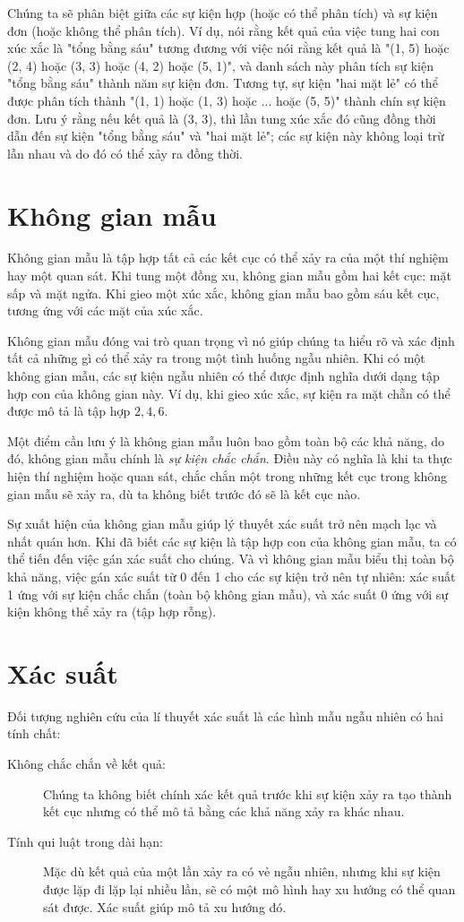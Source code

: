 \documentclass[12pt]{article} %
\begin{document}
Chúng ta sẽ phân biệt giữa các sự kiện hợp (hoặc có thể phân tích) và sự kiện đơn (hoặc không thể phân tích). Ví dụ, nói rằng kết quả của việc tung hai con xúc xắc là "tổng bằng sáu" tương đương với việc nói rằng kết quả là "(1, 5) hoặc (2, 4) hoặc (3, 3) hoặc (4, 2) hoặc (5, 1)", và danh sách này phân tích sự kiện "tổng bằng sáu" thành năm sự kiện đơn. Tương tự, sự kiện "hai mặt lẻ" có thể được phân tích thành "(1, 1) hoặc (1, 3) hoặc ... hoặc (5, 5)" thành chín sự kiện đơn. Lưu ý rằng nếu kết quả là (3, 3), thì lần tung xúc xắc đó cũng đồng thời dẫn đến sự kiện "tổng bằng sáu" và "hai mặt lẻ"; các sự kiện này không loại trừ lẫn nhau và do đó có thể xảy ra đồng thời.

\section{Không gian mẫu}

Không gian mẫu là tập hợp tất cả các kết cục có thể xảy ra của một thí nghiệm hay một quan sát. Khi tung một đồng xu, không gian mẫu gồm hai kết cục: mặt sấp và mặt ngửa. Khi gieo một xúc xắc, không gian mẫu bao gồm sáu kết cục, tương ứng với các mặt của xúc xắc.

Không gian mẫu đóng vai trò quan trọng vì nó giúp chúng ta hiểu rõ và xác định tất cả những gì có thể xảy ra trong một tình huống ngẫu nhiên. Khi có một không gian mẫu, các sự kiện ngẫu nhiên có thể được định nghĩa dưới dạng tập hợp con của không gian này. Ví dụ, khi gieo xúc xắc, sự kiện ra mặt chẵn có thể được mô tả là tập hợp ${2, 4, 6}$.

Một điểm cần lưu ý là không gian mẫu luôn bao gồm toàn bộ các khả năng, do đó, không gian mẫu chính là \emph{sự kiện chắc chắn}. Điều này có nghĩa là khi ta thực hiện thí nghiệm hoặc quan sát, chắc chắn một trong những kết cục trong không gian mẫu sẽ xảy ra, dù ta không biết trước đó sẽ là kết cục nào.

Sự xuất hiện của không gian mẫu giúp lý thuyết xác suất trở nên mạch lạc và nhất quán hơn. Khi đã biết các sự kiện là tập hợp con của không gian mẫu, ta có thể tiến đến việc gán xác suất cho chúng. Và vì không gian mẫu biểu thị toàn bộ khả năng, việc gán xác suất từ 0 đến 1 cho các sự kiện trở nên tự nhiên: xác suất 1 ứng với sự kiện chắc chắn (toàn bộ không gian mẫu), và xác suất 0 ứng với sự kiện không thể xảy ra (tập hợp rỗng).

\section{Xác suất}
Đối tượng nghiên cứu của lí thuyết xác suất là các hình mẫu ngẫu nhiên có hai tính chất:
\begin{description}
    \item [Không chắc chắn về kết quả:] Chúng ta không biết chính xác kết quả trước khi sự kiện xảy ra tạo thành kết cục nhưng có thể mô tả bằng các khả năng xảy ra khác nhau.
    \item [Tính qui luật trong dài hạn:] Mặc dù kết quả của một lần xảy ra có vẻ ngẫu nhiên, nhưng khi sự kiện được lặp đi lặp lại nhiều lần, sẽ có một mô hình hay xu hướng có thể quan sát được. Xác suất giúp mô tả xu hướng đó. 
\end{description}
\end{document}
